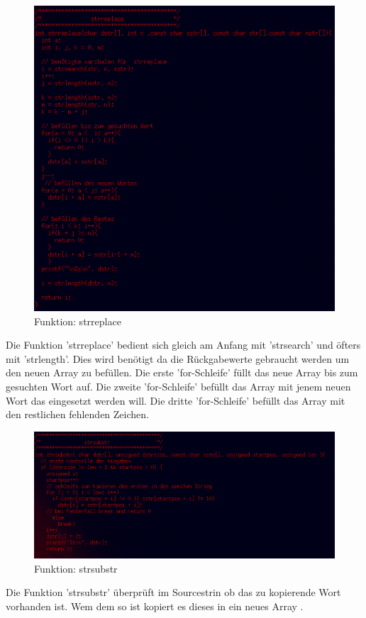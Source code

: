\documentclass{scrartcl}
\begin{document}
\begin{figure}[H]
  \centering
  \includegraphics[width=0.9\linewidth]{images/strreplace.png}
  \caption{Funktion: strreplace}
  \label{fig:digraph}
\end{figure}
Die Funktion 'strreplace' bedient sich gleich am Anfang mit 'strsearch' und öfters mit 'strlength'. Dies wird benötigt da die Rückgabewerte gebraucht werden um den neuen Array zu befüllen. Die erste 'for-Schleife' füllt das neue Array bis zum gesuchten Wort auf. Die zweite 'for-Schleife' befüllt das Array mit jenem neuen Wort das eingesetzt werden will. Die dritte 'for-Schleife' befüllt das Array mit den restlichen fehlenden Zeichen.

\begin{figure}[H]
  \centering
  \includegraphics[width=0.9\linewidth]{images/strsubstr.png}
  \caption{Funktion: strsubstr}
  \label{fig:digraph}
\end{figure}
Die Funktion 'strsubstr' überprüft im Sourcestrin ob das zu kopierende Wort vorhanden ist. Wem dem so ist kopiert es dieses in ein neues Array .
\newpage
\end{document}
